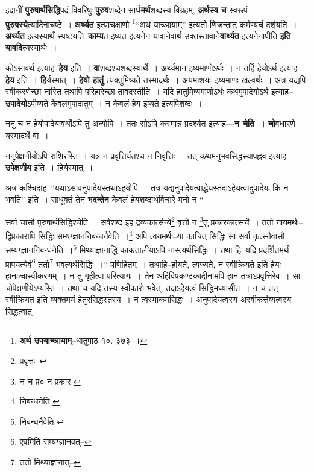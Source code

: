 \documentclass[article,12pt,a4paper]{memoir}
\begin{document}
	  \pstart इदानीं \textbf{पुरुषार्थसिद्धि}पदं विवरिषुः \textbf{पुरुष}शब्देन सार्ध\textbf{मर्थ}शब्दस्य विग्रहम्, \textbf{अर्थस्य च} स्वरूपं \textbf{पुरुषस्ये}त्यादिनाचष्टे । \textbf{अर्थ्यत} इत्याचक्षाणो \footnote{\textbf{अर्थ उपयाच्ञायाम्}--धातुपाठ १०. ३७३ ।}“अर्थ याच्ञायाम्” इत्यतो णिजन्तात् कर्मण्यचं दर्शयति । \textbf{अर्थ्यत} इत्यस्यार्थं स्पष्टयति--\textbf{काम्य}त इष्यत इत्यनेन यावानेवार्थ उक्तस्तावाने\textbf{वार्थ्यत} इत्यनेनापीति \textbf{इति यावदि}त्यस्यार्थः ।
	\pend
      

	  \pstart कोऽसावर्थ इत्याह--\textbf{हेय} इति । \textbf{वा}शब्दश्चशब्दस्यार्थे । अर्थ्यमान इष्यमाणोऽर्थः । न तर्हि हेयोऽर्थ इत्याह--\textbf{हेय} इति । \textbf{हि}र्यस्मात् । \textbf{हेयो हातुं} त्यक्तुमिष्यते तस्मादर्थः । अयमाशयः--इष्यमाणः खल्वर्थः । अत्र यद्यपि स्वीकरणेच्छा नास्ति तथापि परिहारेच्छा तावदस्तीति । यदि हातुमिष्यमाणोऽर्थः कथमुपादेयोऽर्थ इत्याह--\textbf{उपादेयो}ऽपीष्यते केवलमुपादातुम् । न केवलं हेय इष्यते इत्यपिशब्दः ।
	\pend
      

	  \pstart ननु च न हेयोपादेयावर्थोऽपि तु अन्योपि । ततः सोऽपि कस्मान्न प्रदर्श्यत इत्याह—\textbf{न चेति । चो}वधारणे यस्मादर्थे वा ।
	\pend
      

	  \pstart ननूपेक्षणीयोऽपि राशिरस्ति । यत्र न प्रवृत्तिर्यतश्च न निवृत्तिः । तत् कथमनुभवसिद्धस्यापह्नव इत्याह--\textbf{उपेक्षणीय} इति । हिर्यस्मात् ।
	\pend
      

	  \pstart अत्र कश्चिदाह--“यथाऽसावनुपादेयस्तथाऽहयोपि । तत्र यद्यनुपादेयत्वाद्धेयस्तदाऽहेयत्वादुपादेयः किं न भवति” इति । साधूक्तं तेन \textbf{भदन्तेन} केवलं हेयशब्दार्थविचारे मनो न  \leavevmode{} “
	  
	सर्वा चासौ पुरुषार्थसिद्धिश्चेति । सर्वशब्द इह द्रव्यकार्त्सन्ये\footnote{प्रवृत्तः--\cite{dp-msD}} वृत्तो न \footnote{न च प्र० \cite{dp-msB} \cite{dp-edH} न प्रकार \cite{dp-msC} \cite{dp-edP} \cite{dp-edE}}तु प्रकारकार्त्स्न्ये । ततो नायमर्थः--द्विप्रकारापि सिद्धिः सम्यग्ज्ञाननिबन्धनैवेति ।\footnote{निबन्धनेति \cite{dp-msA} \cite{dp-msB} \cite{dp-msD} \cite{dp-edP} \cite{dp-edH} \cite{dp-edE}} अपि त्वयमर्थः--या काचित् सिद्धिः सा सर्वा कृत्स्नैवासौ सम्यग्ज्ञाननिबन्धनेति ।\footnote{निबन्धनैवेति \cite{dp-msA} \cite{dp-edP} \cite{dp-edH} \cite{dp-edE}} मिथ्याज्ञानाद्धि काकतालीयाऽपि नास्त्यर्थसिद्धिः । तथा हि--यदि प्रदर्शितमर्थं प्रापयत्येवं\footnote{एवमिति सम्यग्ज्ञानवत्--\cite{dp-msD-n}} ततो\footnote{ततो मिथ्याज्ञानात्--\cite{dp-msD-n}} भवत्यर्थसिद्धिः ।” प्रणिहितम् । तथाहि--हीयते, त्यज्यते, न स्वीक्रियते इति हेयः । हानञ्चास्वीकरणम् । न तु गृहीत्वा परित्यागः । तेन अहिविषकण्टकादीनामपि हानं तत्रा\leavevmode{}ऽप्रवृत्तिरेव । सा चोपेक्षणीयेऽप्यस्ति । तथा च यदि तस्य स्वीकारो भवेत्, तदाऽहेयत्वं सिद्धिमध्यासीत । न च तत् स्वीक्रियत इति व्यक्तमयं हेतुरसिद्धस्तस्य । न त्वस्माकमसिद्धः । अनुपादेयत्वस्य अस्वीकर्त्तव्यत्वस्य सिद्धत्वात् ।
	\pend
      
\end{document}
